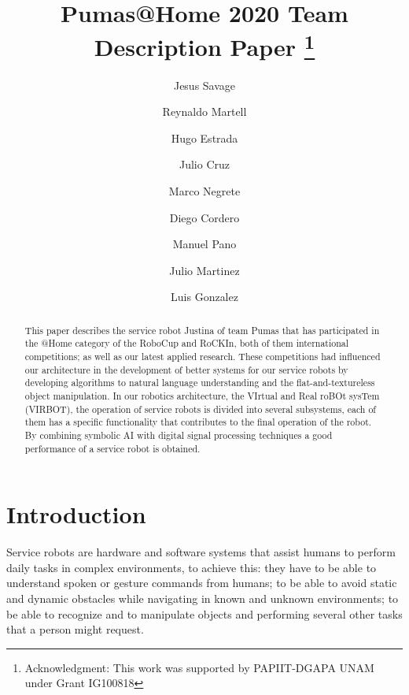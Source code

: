 \documentclass{llncs}
\begin{document}
\title{Pumas@Home 2020 Team Description Paper
\thanks{Acknowledgment: This work was supported by PAPIIT-DGAPA UNAM under Grant IG100818}}
\author{
	Jesus Savage 
	\and Reynaldo Martell 
	\and Hugo Estrada 
	\and Julio Cruz 
	\and Marco Negrete 
	\and Diego Cordero
	\and Manuel Pano
	\and Julio Martinez
	\and Luis Gonzalez
}
\maketitle


\begin{abstract}

This paper describes the service robot Justina of team Pumas that has participated in the @Home category of the RoboCup and RoCKIn, both of them international competitions; as well as our latest applied research. These competitions had influenced our architecture in the development of better systems for our service robots by developing algorithms to natural language understanding and the flat-and-textureless object manipulation.
In our robotics architecture, the VIrtual and Real roBOt sysTem (VIRBOT), the operation of service robots is divided into several subsystems, each of them has a specific functionality  that contributes to the final operation of the robot.
By combining symbolic AI with digital signal processing techniques a good performance of a service robot is obtained.

\end{abstract}


\section{Introduction}

Service robots are hardware and software systems that assist humans to perform daily tasks in complex environments, to achieve this: they have to be able to understand spoken or gesture commands from humans; to be able to avoid static and dynamic obstacles while navigating in known and unknown environments; to be able to recognize and to manipulate objects and performing several other tasks that a person might request. 
\end{document}
